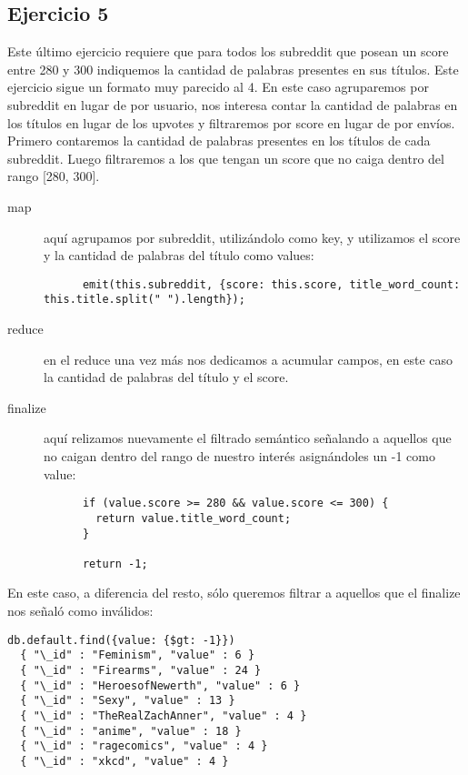 \subsection{Ejercicio 5}
Este último ejercicio requiere que para todos los subreddit que posean un score
entre 280 y 300 indiquemos la cantidad de palabras presentes en sus títulos.
Este ejercicio sigue un formato muy parecido al 4. En este caso agruparemos
por subreddit en lugar de por usuario, nos interesa contar la cantidad
de palabras en los títulos en lugar de los upvotes y filtraremos por score
en lugar de por envíos.
Primero contaremos la cantidad de palabras presentes en los títulos de cada 
subreddit. Luego filtraremos a los que tengan un score que no caiga dentro 
del rango [280, 300].
\begin{description}
  \item[map] aquí agrupamos por subreddit, utilizándolo como key, y utilizamos
    el score y la cantidad de palabras del título como values:
    \begin{lstlisting}
      emit(this.subreddit, {score: this.score, title_word_count: this.title.split(" ").length});
    \end{lstlisting}
  \item[reduce] en el reduce una vez más nos dedicamos a acumular campos,
    en este caso la cantidad de palabras del título y el score. 
  \item[finalize] aquí relizamos nuevamente el filtrado semántico
    señalando a aquellos que no caigan dentro del rango de nuestro interés
   asignándoles un -1 como value:
   \begin{lstlisting}
      if (value.score >= 280 && value.score <= 300) {
        return value.title_word_count;
      }

      return -1;
   \end{lstlisting}
\end{description}
En este caso, a diferencia del resto, sólo queremos filtrar a aquellos
que el finalize nos señaló como inválidos:
\begin{lstlisting}
db.default.find({value: {$gt: -1}})
  { "\_id" : "Feminism", "value" : 6 }
  { "\_id" : "Firearms", "value" : 24 }
  { "\_id" : "HeroesofNewerth", "value" : 6 }
  { "\_id" : "Sexy", "value" : 13 }
  { "\_id" : "TheRealZachAnner", "value" : 4 }
  { "\_id" : "anime", "value" : 18 }
  { "\_id" : "ragecomics", "value" : 4 }
  { "\_id" : "xkcd", "value" : 4 }
\end{lstlisting}
